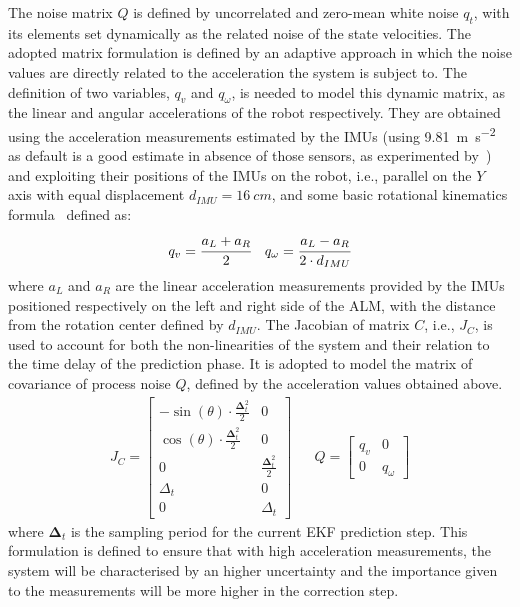 The noise matrix $Q$ is defined by uncorrelated and zero-mean white noise $q_t$, with its elements set dynamically as the related noise of the state velocities.
The adopted matrix formulation is defined by an adaptive approach in which the noise values are directly related to the acceleration the system is subject to. %
The definition of two variables, $q_v$ and $q_{\omega}$, is needed to model this dynamic matrix, as the linear and angular accelerations of the robot respectively.
They are obtained using the acceleration measurements estimated by the \glspl{IMU} (using \SI{9.81}{\metre\per\square\second} as default is a good estimate in absence of those sensors, as experimented by~\cite{king_low_2008}) and exploiting their positions of the \glspl{IMU} on the robot, i.e., parallel on the $Y$ axis with equal displacement $d_{IMU}=\SI{16}{cm}$, and some basic rotational kinematics formula~\cite{rotational} defined as:%
\begin{align}
    q_v = \cfrac{a_L + a_R}{2} &&
    q_{\omega} = \cfrac{a_L - a_R}{2 \cdot d_{IMU}}
    \label{eq:rot}
\end{align}
where $a_L$ and $a_R$ are the linear acceleration measurements provided by the \glspl{IMU} positioned respectively on the left and right side of the \gls{ALM}, with the distance from the rotation center defined by $d_{IMU}$. 
The Jacobian of matrix $C$, i.e., $J_C$, is used to account for both the non-linearities of the system and their relation to the time delay of the prediction phase.
It is adopted to model the matrix of covariance of process noise $Q$, defined by the acceleration values obtained above.
\begin{align}%
	\label{eq:q-p}
	J_C
	=
	\begin{bmatrix}
		-\sin(\theta) \cdot \frac{\boldsymbol \Delta_t^2}{2}  & 0 \\
		\cos(\theta) \cdot \frac{\boldsymbol \Delta_t^2}{2}  & 0 \\
		0 & \frac{\boldsymbol \Delta_t^2}{2} \\
		\Delta_t & 0 \\
		0 & \Delta_t
	\end{bmatrix}
	&&
	Q
	=
	\begin{bmatrix}
		q_v & 0 \\
		0 & q_{\omega}
	\end{bmatrix}
\end{align}
where $\boldsymbol \Delta_t$ is the sampling period for the current \gls{EKF} prediction step.
This formulation is defined to ensure that with high acceleration measurements, the system will be characterised by an higher uncertainty and the importance given to the measurements will be more higher in the correction step. %

